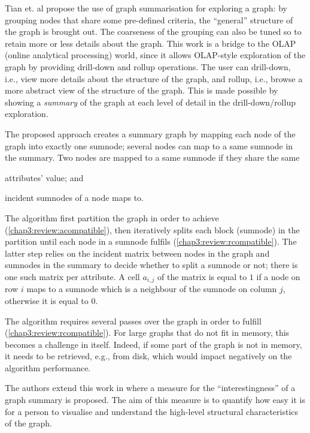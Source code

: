 Tian et. al \cite{tian:sigmod:2008} propose the use of graph summarisation for exploring a graph: by grouping nodes that share some pre-defined criteria, the ``general'' structure of the graph is brought out. The coarseness of the grouping can also be tuned so to retain more or less details about the graph. This work is a bridge to the OLAP (online analytical processing) world, since it allows OLAP-style exploration of the graph by providing drill-down and rollup operations. The user can drill-down, i.e., view more details about the structure of the graph, and rollup, i.e., browse a more abstract view of the structure of the graph. This is made possible by showing a \emph{summary} of the graph at each level of detail in the drill-down/rollup exploration.

The proposed approach creates a summary graph by mapping each node of the graph into exactly one sumnode; several nodes can map to a same sumnode in the summary. Two nodes are mapped to a same sumnode if they share the same
\begin{inparaenum}[(a)]
	\item attributes' value; and
	\label{chap3:review:acompatible}
	\item incident sumnodes of a node maps to.
	\label{chap3:review:rcompatible}
\end{inparaenum}
The algorithm first partition the graph in order to achieve (\ref{chap3:review:acompatible}), then iteratively splits each block (sumnode) in the partition until each node in a sumnode fulfils (\ref{chap3:review:rcompatible}). The latter step relies on the incident matrix between nodes in the graph and sumnodes in the summary to decide whether to split a sumnode or not; there is one such matrix per attribute. A cell $a_{i,j}$ of the matrix is equal to $1$ if a node on row $i$ maps to a sumnode which is a neighbour of the sumnode on column $j$, otherwise it is equal to $0$.

The algorithm requires several passes over the graph in order to fulfill (\ref{chap3:review:rcompatible}). For large graphs that do not fit in memory, this becomes a challenge in itself. Indeed, if some part of the graph is not in memory, it needs to be retrieved, e.g., from disk, which would impact negatively on the algorithm performance.

The authors extend this work in \cite{zhang:2010:ddg} where a measure for the ``interestingness'' of a graph summary is proposed. The aim of this measure is to quantify how easy it is for a person to visualise and understand the high-level structural characteristics of the graph. 

